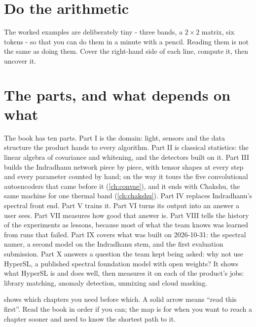 \section*{Do the arithmetic}

The worked examples are deliberately tiny - three bands, a $2\times 2$ matrix, six tokens - so that
you can do them in a minute with a pencil. Reading them is not the same as doing them. Cover the
right-hand side of each line, compute it, then uncover it.

\section*{The parts, and what depends on what}

The book has ten parts. Part I is the domain: light, sensors and the data structure the product
hands to every algorithm. Part II is classical statistics: the linear algebra of covariance and
whitening, and the detectors built on it. Part III builds the Indradhanu network piece by piece,
with tensor shapes at every step and every parameter counted by hand; on the way it tours the five
convolutional autoencoders that came before it (\cref{ch:convae}), and it ends with Chakshu, the same machine
for one thermal band (\cref{ch:chakshu}). Part IV replaces Indradhanu's
spectral front end. Part V trains it. Part VI turns its output into an answer a user sees. Part VII
measures how good that answer is. Part VIII tells the history of the experiments as lessons, because
most of what the team knows was learned from runs that failed. Part IX covers what was built on 2026-10-31: the
spectral namer, a second model on the Indradhanu stem, and the first evaluation submission. Part X answers a question
the team kept being asked: why not use HyperSL, a published spectral foundation model with open weights? It shows what
HyperSL is and does well, then measures it on each of the product's jobs: library matching, anomaly detection, unmixing
and cloud masking.

 shows which chapters you need before which. A solid arrow means ``read
this first''. Read the book in order if you can; the map is for when you want to reach a chapter
sooner and need to know the shortest path to it.

